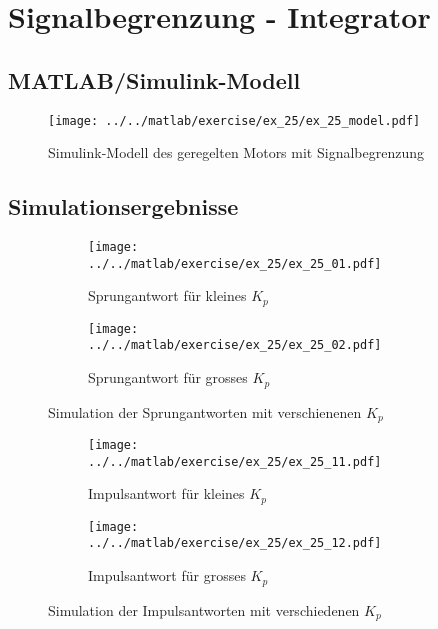 \section{Signalbegrenzung - Integrator}

\subsection{MATLAB/Simulink-Modell}

\begin{figure}[h!]
	\centering
	\texttt{[image: ../../matlab/exercise/ex\_25/ex\_25\_model.pdf]}
	\caption{Simulink-Modell des geregelten Motors mit Signalbegrenzung}
\end{figure}

\subsection{Simulationsergebnisse}
\begin{figure}[h!]
	\centering
	\begin{subfigure}{0.45\textwidth}
		\texttt{[image: ../../matlab/exercise/ex\_25/ex\_25\_01.pdf]}
		\caption{Sprungantwort für kleines $K_p$}
		\label{fig:ex_25_01}
	\end{subfigure}
	\hfill{}
	\begin{subfigure}{0.45\textwidth}
		\texttt{[image: ../../matlab/exercise/ex\_25/ex\_25\_02.pdf]}
		\caption{Sprungantwort für grosses $K_p$}
	\end{subfigure}
	\caption{Simulation der Sprungantworten mit verschienenen $K_p$}
\end{figure}

\begin{figure}[h!]
	\centering
	\begin{subfigure}{0.45\textwidth}
		\texttt{[image: ../../matlab/exercise/ex\_25/ex\_25\_11.pdf]}
		\caption{Impulsantwort für kleines $K_p$}
		\label{fig:ex_25_11}
	\end{subfigure}
	\hfill{}
	\begin{subfigure}{0.45\textwidth}
		\texttt{[image: ../../matlab/exercise/ex\_25/ex\_25\_12.pdf]}
		\caption{Impulsantwort für grosses $K_p$}
	\end{subfigure}
	\caption{Simulation der Impulsantworten mit verschiedenen $K_p$}
\end{figure}
